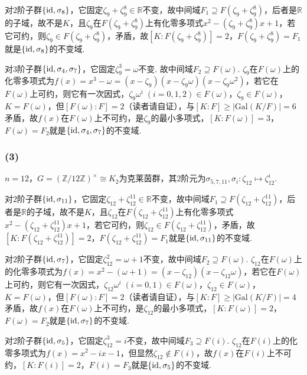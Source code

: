 对$2$阶子群$\{\operatorname{id},\sigma_8\}$，它固定$\zeta_9+\zeta_9^8\in\mathbb{R}$不变，故中间域$F_1\supseteq F(\zeta_9+\zeta_9^8)$，后者是$\mathbb{R}$的子域，故不是$K$，且$\zeta_9$在$F(\zeta_9+\zeta_9^8)$上有化零多项式$x^2-(\zeta_9+\zeta_9^8)x+1$，若它可约，则$\zeta_9\in F(\zeta_9+\zeta_9^8)$，矛盾，故$[K: F(\zeta_9+\zeta_9^8)]=2$，$F(\zeta_9+\zeta_9^8)=F_1$就是$\{\operatorname{id},\sigma_8\}$的不变域.

对$3$阶子群$\{\operatorname{id}, \sigma_4, \sigma_7\}$，它固定$\zeta_9^3=\omega$不变. 故中间域$F_2\supseteq F(\omega)$. $\zeta_9$在$F(\omega)$上的化零多项式为$f(x)=x^3-\omega=(x-\zeta_9)(x-\zeta_9\omega)(x-\zeta_9\omega^2)$，若它在$F(\omega)$上可约，则它有一次因式，$\zeta_9\omega^i\;(i=0,1,2)\in F(\omega)$，$\zeta_9\in F(\omega)$，$K=F(\omega)$，但$[F(\omega):F]=2$（读者请自证），与$[K:F]\geq|\mathrm{Gal}(K/F)|=6$矛盾，故$f(x)$在$F(\omega)$上不可约，是$\zeta_9$的最小多项式，$[K:F(\omega)]=3$，$F(\omega)=F_2$就是$\{\operatorname{id},\sigma_4,\sigma_7\}$的不变域.
\subsubsection{(3)}
$n=12$，$G=(\mathbb{Z}/12\mathbb{Z})^{\times}\cong K_2$为克莱茵群，其$2$阶元为$\sigma_{5,7,11}, \sigma_i:\zeta_{12}\mapsto\zeta_{12}^i$.

对$2$阶子群$\{\operatorname{id}, \sigma_{11}\}$，它固定$\zeta_{12}+\zeta_{12}^{11}\in\mathbb{R}$不变，故中间域$F_1\supseteq F(\zeta_{12}+\zeta_{12}^{11})$，后者是$\mathbb{R}$的子域，故不是$K$，且$\zeta_{12}$在$F(\zeta_{12}+\zeta_{12}^{11})$上有化零多项式$x^2-(\zeta_{12}+\zeta_{12}^{11})x+1$，若它可约，则$\zeta_{12}\in F(\zeta_{12}+\zeta_{12}^{11})$，矛盾，故$[K: F(\zeta_{12}+\zeta_{12}^{11})]=2$，$F(\zeta_{12}+\zeta_{12}^{11})=F_1$就是$\{\operatorname{id},\sigma_{11}\}$的不变域.

对$2$阶子群$\{\operatorname{id}, \sigma_7\}$，它固定$\zeta_{12}^2=\omega+1$不变，故中间域$F_2\supseteq F(\omega)$. $\zeta_{12}$在$F(\omega)$上的化零多项式为$f(x)=x^2-(\omega+1)=(x-\zeta_{12})(x-\zeta_{12}\omega)$，若它在$F(\omega)$上可约，则它有一次因式，$\zeta_{12}\omega^i\;(i=0,1)\in F(\omega)$，$\zeta_{12}\in F(\omega)$，$K=F(\omega)$，但$[F(\omega):F]=2$（读者请自证），与$[K:F]\geq|\mathrm{Gal}(K/F)|=4$矛盾，故$f(x)$在$F(\omega)$上不可约，是$\zeta_{12}$的最小多项式，$[K:F(\omega)]=2$，$F(\omega)=F_2$就是$\{\operatorname{id},\sigma_7\}$的不变域.

对$2$阶子群$\{\operatorname{id}, \sigma_5\}$，它固定$\zeta_{12}^3=i$不变，故中间域$F_3\supseteq F(i)$.
$\zeta_{12}$在$F(i)$上的化零多项式为$f(x)=x^2-ix-1$，但显然$\zeta_{12}\notin F(i)$，故$f(x)$在$F(i)$上不可约，$[K:F(i)]=2$，$F(i)=F_3$就是$\{\operatorname{id},\sigma_5\}$的不变域.

